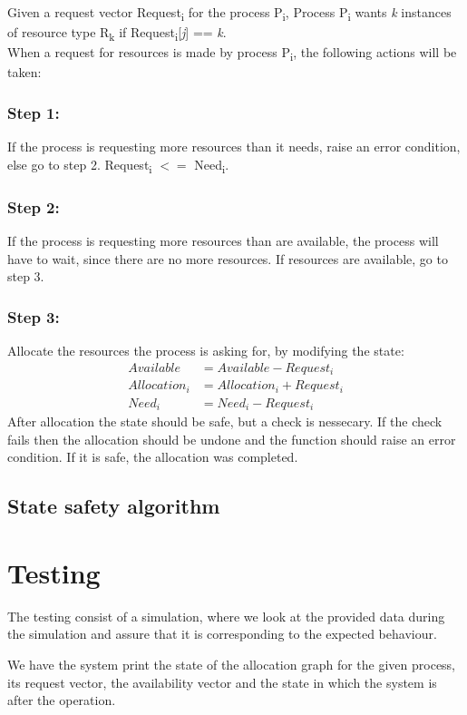 Given a request vector Request\textsubscript{i} for the process P\textsubscript{i}, Process P\textsubscript{i} wants \textit{k} instances of resource type R\textsubscript{k} if Request\textsubscript{i}[\textit{j}] == \textit{k}.\\

When a request for resources is made by process P\textsubscript{i}, the following actions will be taken:

\subsubsection{Step 1:}
If the process is requesting more resources than it needs, raise an error condition, else go to step 2. Request\textsubscript{i} $<=$ Need\textsubscript{i}.

\subsubsection{Step 2:}
If the process is requesting more resources than are available, the process will have to wait, since there are no more resources. If resources are available, go to step 3.

\subsubsection{Step 3:}
Allocate the resources the process is asking for, by modifying the state:
\begin{align*}
Available    &= Available-Request_i\\
Allocation_i &= Allocation_i + Request_i\\
Need_i       &= Need_i - Request_i
\end{align*}
After allocation the state should be safe, but a check is nessecary. If the check fails then the allocation should be undone and the function should raise an error condition. If it is safe, the allocation was completed.



\subsection{State safety algorithm}


\section{Testing}
The testing consist of a simulation, where we look at the provided data during the simulation and assure that it is corresponding to the expected behaviour.

We have the system print the state of the allocation graph for the given process, its request vector, the availability vector and the state in which the system is after the operation.